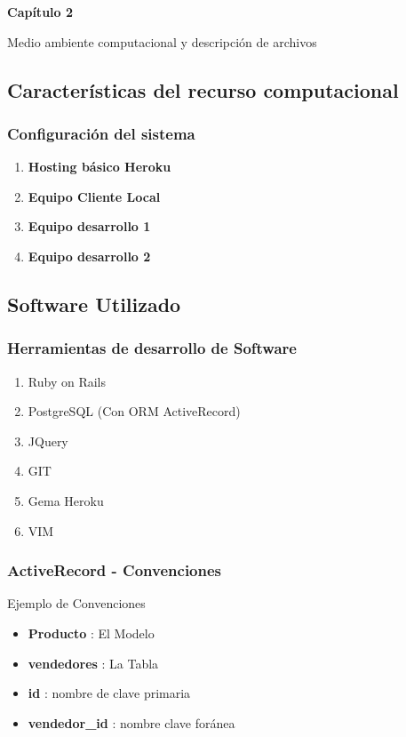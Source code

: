 \documentclass{beamer}
\begin{document}
\begin{frame}
\textbf{Capítulo 2}

\mbox{}

Medio ambiente computacional y descripción de archivos
\end{frame}

\subsection{Características del recurso computacional}

\begin{frame}
\frametitle{Configuración del sistema}

\begin{enumerate}
\item \textbf{Hosting básico Heroku}

\item \textbf{Equipo Cliente Local}

\item \textbf{Equipo desarrollo 1}

\item \textbf{Equipo desarrollo 2}
\end{enumerate}

\end{frame}

\subsection{Software Utilizado}

\begin{frame}
\frametitle{Herramientas de desarrollo de Software}
\begin{enumerate}
\pause
\item \alert{Ruby on Rails} \pause
\item \alert{PostgreSQL (Con ORM ActiveRecord)} \pause
\item JQuery
\item GIT
\item Gema Heroku
\item VIM
\end{enumerate}
\end{frame}

\begin{frame}
\frametitle{ActiveRecord - Convenciones}
Ejemplo de Convenciones
\begin{itemize}
\item \textbf{Producto} : El Modelo
\item \textbf{vendedores} : La Tabla
\item \textbf{id} : nombre de clave primaria
\item \textbf{vendedor\_id} : nombre clave foránea
\end{itemize}
\end{frame}
\end{document}
